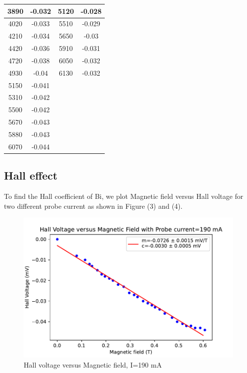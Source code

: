 \documentclass[a4paper, amsfonts, amssymb, amsmath, reprint, showkeys, nofootinbib, twoside]{revtex4-1}
\begin{document}
\begin{table}[H]
{\begin{tabular}{|cc|cc|}
			\multicolumn{1}{|c|}{3890} & -0.032 & \multicolumn{1}{c|}{5120} & -0.028 \\ \hline
			\multicolumn{1}{|c|}{4020} & -0.033 & \multicolumn{1}{c|}{5510} & -0.029 \\ \hline
			\multicolumn{1}{|c|}{4210} & -0.034 & \multicolumn{1}{c|}{5650} & -0.03  \\ \hline
			\multicolumn{1}{|c|}{4420} & -0.036 & \multicolumn{1}{c|}{5910} & -0.031 \\ \hline
			\multicolumn{1}{|c|}{4720} & -0.038 & \multicolumn{1}{c|}{6050} & -0.032 \\ \hline
			\multicolumn{1}{|c|}{4930} & -0.04  & \multicolumn{1}{c|}{6130} & -0.032 \\ \hline
			\multicolumn{1}{|c|}{5150}               & -0.041            & \multicolumn{2}{c|}{\multirow{6}{*}{}}                      \\ \cline{1-2}
			\multicolumn{1}{|c|}{5310} & -0.042 & \multicolumn{2}{c|}{}              \\ \cline{1-2}
			\multicolumn{1}{|c|}{5500} & -0.042 & \multicolumn{2}{c|}{}              \\ \cline{1-2}
			\multicolumn{1}{|c|}{5670} & -0.043 & \multicolumn{2}{c|}{}              \\ \cline{1-2}
			\multicolumn{1}{|c|}{5880} & -0.043 & \multicolumn{2}{c|}{}              \\ \cline{1-2}
			\multicolumn{1}{|c|}{6070} & -0.044 & \multicolumn{2}{c|}{}              \\ \hline
		\end{tabular}%
	}
\end{table}

\subsection{Hall effect}

To find the Hall coefficient of Bi, we plot Magnetic field versus Hall voltage for two different probe current as shown in Figure (3) and (4).

\begin{figure}[H]
	\centering
	\includegraphics[scale=0.5]{3} 
	\caption{Hall voltage versus Magnetic field, I=190 mA}
	\label{2}
\end{figure}
\end{document}
